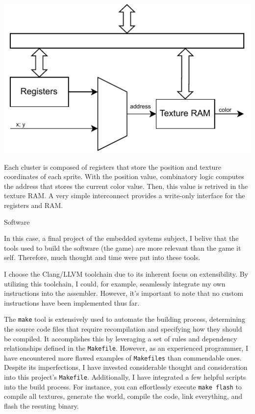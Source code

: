 \documentclass[12pt,a4paper]{article}
\makeatletter
\renewcommand{\section}{%
  \@startsection{section}{1}{0pt}{-3.5ex plus -1ex minus -.2ex}{2.3ex plus .2ex}{\Large\bfseries\sffamily}%
}
\makeatother
\begin{document}
\begin{center}
\includegraphics{schema2.pdf}
\label{fig:schema2}
\end{center}

Each cluster is composed of registers that store the position and texture
coordinates of each sprite. With the position value, combinatory logic
computes the address that stores the current color value. Then, this value is
retrived in the texture RAM. A very simple interconnect provides a write-only
interface for the registers and RAM.

\section{Software}

In this case, a final project of the embedded systems subject, I belive that the
tools used to build the software (the game) are more relevant than the game it
self. Therefore, much thought and time were put into these tools.

I choose the Clang/LLVM toolchain due to its inherent focus on extensibility.
By utilizing this toolchain, I could, for example, seamlessly integrate my own
instructions into the assembler. However, it's important to note that no custom
instructions have been implemented thus far.

The \texttt{make} tool is extensively used to automate the building process,
determining the source code files that require recompilation and specifying how
they should be compiled. It accomplishes this by leveraging a set of rules and
dependency relationships defined in the \texttt{Makefile}. However, as an
experienced programmer, I have encountered more flawed examples of
\texttt{Makefiles} than commendable ones. Despite its imperfections, I have
invested considerable thought and consideration into this project's
\texttt{Makefile}. Additionally, I have integrated a few helpful scripts into
the build process. For instance, you can effortlessly execute
\texttt{make flash} to compile all textures, generate the world, compile the
code, link everything, and flash the resuting binary.
\end{document}
